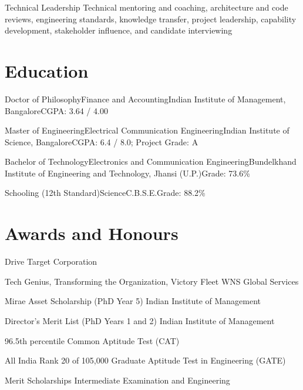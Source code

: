 \documentclass[11pt,a4paper]{moderncv}
\begin{document}
    {Technical Leadership}
    {Technical mentoring and coaching, architecture and code reviews, engineering standards, knowledge transfer, project leadership, capability development, stakeholder influence, and candidate interviewing}
    {}{}{}

\hypertarget{education}{
\section{Education}\label{education}}

\nopagebreak
    {Doctor of Philosophy}{Finance and Accounting}{Indian Institute of Management, Bangalore}{}{CGPA: 3.64 / 4.00}

    {Master of Engineering}{Electrical Communication Engineering}{Indian Institute of Science, Bangalore}{}{CGPA: 6.4 / 8.0; Project Grade: A}

    {Bachelor of Technology}{Electronics and Communication Engineering}{Bundelkhand Institute of Engineering and Technology, Jhansi (U.P.)}{}{Grade: 73.6\%}

    {Schooling (12th Standard)}{Science}{C.B.S.E.}{}{Grade: 88.2\%}

\hypertarget{awards-and-honours}{
\section{Awards and Honours}\label{awards-and-honours}}

\nopagebreak
    {Drive}
    {Target Corporation}{}{}{}

    {Tech Genius, Transforming the Organization, Victory Fleet}
    {WNS Global Services}{}{}{}

    {Mirae Asset Scholarship (PhD Year 5)}
    {Indian Institute of Management}{}{}{}

    {Director's Merit List (PhD Years 1 and 2)}
    {Indian Institute of Management}{}{}{}

    {96.5th percentile}
    {Common Aptitude Test (CAT)}{}{}{}

    {All India Rank 20 of 105,000}
    {Graduate Aptitude Test in Engineering (GATE)}{}{}{}

    {Merit Scholarships}
    {Intermediate Examination and Engineering}{}{}{}
\end{document}
